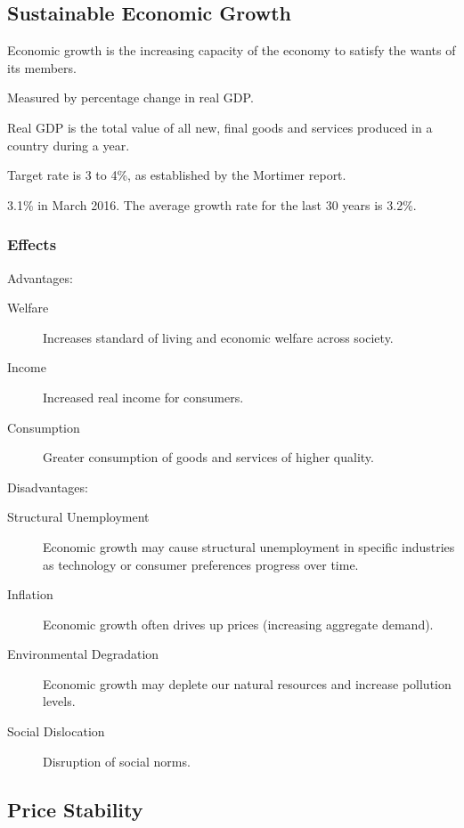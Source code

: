 \documentclass[a4paper,11pt]{report}
\begin{document}
\subsection{Sustainable Economic Growth}

Economic growth is the increasing capacity of the economy to satisfy the wants
of its members.

Measured by percentage change in real GDP.

Real GDP is the total value of all new, final goods and services produced in a
country during a year.

Target rate is 3 to 4\%, as established by the Mortimer report.

3.1\% in March 2016. The average growth rate for the last 30 years is 3.2\%.

\subsubsection{Effects}

Advantages:

\begin{description}
\item [Welfare] Increases standard of living and economic welfare across
	society.
\item [Income] Increased real income for consumers.
\item [Consumption] Greater consumption of goods and services of higher quality.
\end{description}

Disadvantages:

\begin{description}
\item [Structural Unemployment] Economic growth may cause structural
	unemployment in specific industries as technology or consumer preferences
	progress over time.
\item [Inflation] Economic growth often drives up prices (increasing
	aggregate demand).
\item [Environmental Degradation] Economic growth may deplete our natural
	resources and increase pollution levels.
\item [Social Dislocation] Disruption of social norms.
\end{description}

\subsection{Price Stability}
\end{document}

